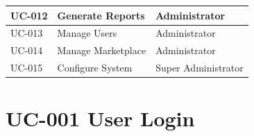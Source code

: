\begin{longtable}{|p{2.5cm}|p{6cm}|p{4cm}|}
UC-012

&

Generate Reports

&

Administrator

\\

\hline

UC-013

&

Manage Users

&

Administrator

\\

\hline

UC-014

&

Manage Marketplace

&

Administrator

\\

\hline

UC-015

&

Configure System

&

Super Administrator

\\

\hline

\end{longtable}

\section{UC-001 User Login}

